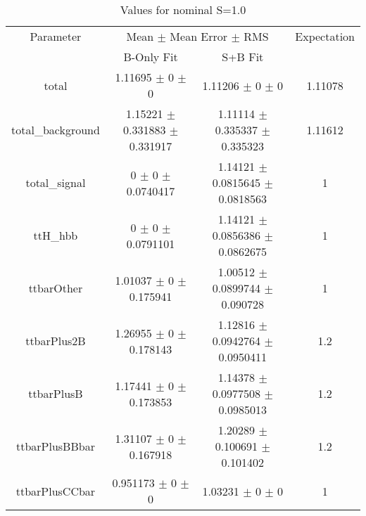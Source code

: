 \begin{table}
\centering
\caption{Values for nominal S=1.0}
\begin{tabular}{cccc}
\toprule
Parameter & \multicolumn{2}{c}{Mean $\pm$ Mean Error $\pm$ RMS} & Expectation\\
 & B-Only Fit & S+B Fit & \\
\midrule
total & \num{1.11695} $\pm$ \num{0} $\pm$ \num{0} & \num{1.11206} $\pm$ \num{0} $\pm$ \num{0} & \num{1.11078}\\
total\_background & \num{1.15221} $\pm$ \num{0.331883} $\pm$ \num{0.331917} & \num{1.11114} $\pm$ \num{0.335337} $\pm$ \num{0.335323} & \num{1.11612}\\
total\_signal & \num{0} $\pm$ \num{0} $\pm$ \num{0.0740417} & \num{1.14121} $\pm$ \num{0.0815645} $\pm$ \num{0.0818563} & \num{1}\\
ttH\_hbb & \num{0} $\pm$ \num{0} $\pm$ \num{0.0791101} & \num{1.14121} $\pm$ \num{0.0856386} $\pm$ \num{0.0862675} & \num{1}\\
ttbarOther & \num{1.01037} $\pm$ \num{0} $\pm$ \num{0.175941} & \num{1.00512} $\pm$ \num{0.0899744} $\pm$ \num{0.090728} & \num{1}\\
ttbarPlus2B & \num{1.26955} $\pm$ \num{0} $\pm$ \num{0.178143} & \num{1.12816} $\pm$ \num{0.0942764} $\pm$ \num{0.0950411} & \num{1.2}\\
ttbarPlusB & \num{1.17441} $\pm$ \num{0} $\pm$ \num{0.173853} & \num{1.14378} $\pm$ \num{0.0977508} $\pm$ \num{0.0985013} & \num{1.2}\\
ttbarPlusBBbar & \num{1.31107} $\pm$ \num{0} $\pm$ \num{0.167918} & \num{1.20289} $\pm$ \num{0.100691} $\pm$ \num{0.101402} & \num{1.2}\\
ttbarPlusCCbar & \num{0.951173} $\pm$ \num{0} $\pm$ \num{0} & \num{1.03231} $\pm$ \num{0} $\pm$ \num{0} & \num{1}\\
\bottomrule
\end{tabular}
\end{table}